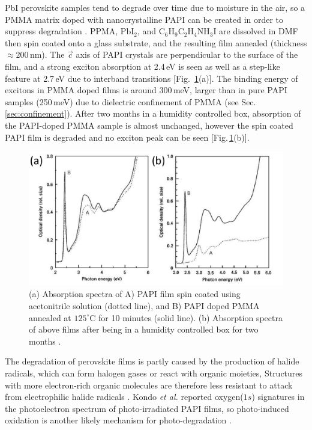 PbI perovskite samples tend to degrade over time due to moisture in the air, so a PMMA matrix doped with nanocrystalline PAPI can be created in order to suppress degradation \cite{Kitazawa1998}. PPMA, Pb$\textrm{I}_2$, and $\textrm{C}_6\textrm{H}_9\textrm{C}_2\textrm{H}_4\textrm{NH}_3\textrm{I}$ are dissolved in DMF then spin coated onto a glass substrate, and the resulting film annealed (thickness $\approx200$\,nm). The $\vec{c}$ axis of PAPI crystals are perpendicular to the surface of the film, and a strong exciton absorption at 2.4\,eV is seen as well as a step-like feature at 2.7\,eV due to interband transitions [Fig.\ \ref{2Fig10}(a)]. The binding energy of excitons in PMMA doped films is around 300\,meV, larger than in pure PAPI samples (250\,meV) due to dielectric confinement of PMMA (see Sec.\,\ref{sec:confinement}). After two months in a humidity controlled box, absorption of the PAPI-doped PMMA sample is almost unchanged, however the spin coated PAPI film is degraded and no exciton peak can be seen [Fig.\,\ref{2Fig10}(b)].
\begin{figure}
\centering
\includegraphics[width=\textwidth]{Fig10}
\caption{ (a) Absorption spectra of A) PAPI film spin coated using acetonitrile solution (dotted line), and B) PAPI doped PMMA annealed at $125^{\circ}$C for 10 minutes (solid line). (b) Absorption spectra of above films after being in a humidity controlled box for two months \cite{Kitazawa1998}.}
\label{2Fig10}
\end{figure}

The degradation of perovskite films is partly caused by the production of halide radicals, which can form halogen gases or react with organic moieties, Structures with more electron-rich organic molecules are therefore less resistant to attack from electrophilic halide radicals \cite{Wei2014}. Kondo \textit{et al.} reported oxygen($1s$) signatures in the photoelectron spectrum of photo-irradiated PAPI films, so photo-induced oxidation is another likely mechanism for photo-degradation \cite{Kitazawa2002}.

